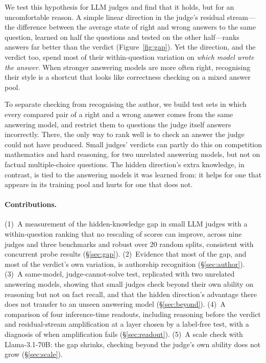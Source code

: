 \documentclass[11pt]{article}
\begin{document}
We test this hypothesis for LLM judges and find that it holds, but for an uncomfortable reason. A simple linear direction in the judge's residual stream---the difference between the average state of right and wrong answers to the same question, learned on half the questions and tested on the other half---ranks answers far better than the verdict (Figure~\ref{fig:gap}). Yet the direction, and the verdict too, spend most of their within-question variation on \emph{which model wrote the answer}. When stronger answering models are more often right, recognising their style is a shortcut that looks like correctness checking on a mixed answer pool.

To separate checking from recognising the author, we build test sets in which every compared pair of a right and a wrong answer comes from the same answering model, and restrict them to questions the judge itself answers incorrectly. There, the only way to rank well is to check an answer the judge could not have produced. Small judges' verdicts can partly do this on competition mathematics and hard reasoning, for two unrelated answering models, but not on factual multiple-choice questions. The hidden direction's extra knowledge, in contrast, is tied to the answering models it was learned from: it helps for one that appears in its training pool and hurts for one that does not.

\paragraph{Contributions.}
(1)~A measurement of the hidden-knowledge gap in small LLM judges with a within-question ranking that no rescaling of scores can improve, across nine judges and three benchmarks and robust over 20 random splits, consistent with concurrent probe results (\S\ref{sec:gap}).
(2)~Evidence that most of the gap, and most of the verdict's own variation, is authorship recognition (\S\ref{sec:author}).
(3)~A same-model, judge-cannot-solve test, replicated with two unrelated answering models, showing that small judges check beyond their own ability on reasoning but not on fact recall, and that the hidden direction's advantage there does not transfer to an unseen answering model (\S\ref{sec:beyond}).
(4)~A comparison of four inference-time readouts, including reasoning before the verdict and residual-stream amplification at a layer chosen by a label-free test, with a diagnosis of when amplification fails (\S\ref{sec:readout}).
(5)~A scale check with Llama-3.1-70B: the gap shrinks, checking beyond the judge's own ability does not grow (\S\ref{sec:scale}).
\end{document}
